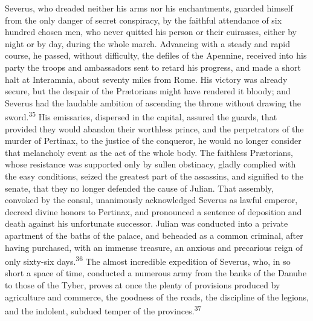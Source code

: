 Severus, who dreaded neither his arms nor his enchantments,
guarded himself from the only danger of secret conspiracy, by the
faithful attendance of six hundred chosen men, who never quitted
his person or their cuirasses, either by night or by day, during
the whole march. Advancing with a steady and rapid course, he
passed, without difficulty, the defiles of the Apennine, received
into his party the troops and ambassadors sent to retard his
progress, and made a short halt at Interamnia, about seventy
miles from Rome. His victory was already secure, but the despair
of the Prætorians might have rendered it bloody; and Severus had
the laudable ambition of ascending the throne without drawing the
sword.\textsuperscript{35} His emissaries, dispersed in the capital, assured the
guards, that provided they would abandon their worthless prince,
and the perpetrators of the murder of Pertinax, to the justice of
the conqueror, he would no longer consider that melancholy event
as the act of the whole body. The faithless Prætorians, whose
resistance was supported only by sullen obstinacy, gladly
complied with the easy conditions, seized the greatest part of
the assassins, and signified to the senate, that they no longer
defended the cause of Julian. That assembly, convoked by the
consul, unanimously acknowledged Severus as lawful emperor,
decreed divine honors to Pertinax, and pronounced a sentence of
deposition and death against his unfortunate successor. Julian
was conducted into a private apartment of the baths of the
palace, and beheaded as a common criminal, after having
purchased, with an immense treasure, an anxious and precarious
reign of only sixty-six days.\textsuperscript{36} The almost incredible expedition
of Severus, who, in so short a space of time, conducted a
numerous army from the banks of the Danube to those of the Tyber,
proves at once the plenty of provisions produced by agriculture
and commerce, the goodness of the roads, the discipline of the
legions, and the indolent, subdued temper of the provinces.\textsuperscript{37}




